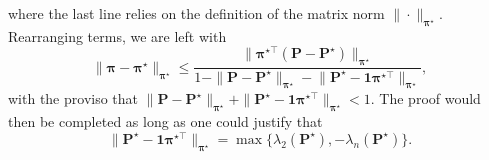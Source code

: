 %
where the last line relies on the definition of the matrix norm $\|\cdot\|_{\bm{\pi}^{\star}}$. Rearranging terms, we are left with
%
\[
	\|\bm{\pi}-\bm{\pi}^{\star}\|_{\bm{\pi}^{\star}}
	\leq\frac{\big\|\bm{\pi}^{\star\top}\left(\bm{P}-\bm{P}^{\star}\right)\big\|_{\bm{\pi}^{\star}}}{1-\|\bm{P}-\bm{P}^{\star}\|_{\bm{\pi}^{\star}}-\big\|\bm{P}^{\star}-\bm{1}\bm{\pi}^{\star\top}\big\|_{\bm{\pi}^{\star}}},
\]
%
with the proviso that $\|\bm{P}-\bm{P}^{\star}\|_{\bm{\pi}^{\star}}+ \|\bm{P}^{\star}-\bm{1}\bm{\pi}^{\star\top}\|_{\bm{\pi}^{\star}}<1$.
The proof would then be completed as long as one could justify that
%
\begin{equation}
	\big\|\bm{P}^{\star}-\bm{1}\bm{\pi}^{\star\top} \big\|_{\bm{\pi}^{\star}}
	=\max\big\{ \lambda_{2}(\bm{P}^{\star}),-\lambda_{n}(\bm{P}^{\star}) \big\} .
	\label{eq:spectral-gap}
\end{equation}
%




